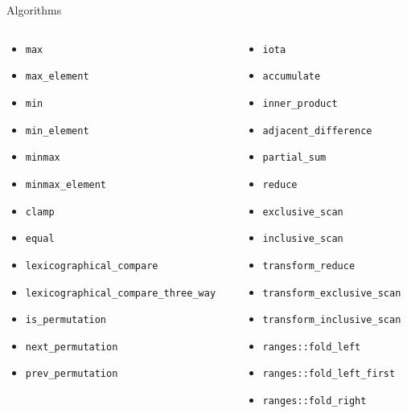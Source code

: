\documentclass[aspectratio=169]{beamer}
\begin{document}
\begin{frame}{Algorithms}
\begin{columns}
\begin{column}{.33\textwidth}
\begin{itemize}
        \item{\texttt{max}}
        \item{\texttt{max_element}}
        \item{\texttt{min}}
        \item{\texttt{min_element}}
        \item{\texttt{minmax}}
        \item{\texttt{minmax_element}}
        \item{\texttt{clamp}}
        \item{\texttt{equal}}
        \item{\texttt{lexicographical_compare}}
        \item{\texttt{lexicographical_compare_three_way}}
        \item{\texttt{is_permutation}}
        \item{\texttt{next_permutation}}
        \item{\texttt{prev_permutation}}
      \end{itemize}
    \end{column}
    \begin{column}{.33\textwidth}
      \begin{itemize}
        \item{\texttt{iota}}
        \item{\texttt{accumulate}}
        \item{\texttt{inner_product}}
        \item{\texttt{adjacent_difference}}
        \item{\texttt{partial_sum}}
        \item{\texttt{reduce}}
        \item{\texttt{exclusive_scan}}
        \item{\texttt{inclusive_scan}}
        \item{\texttt{transform_reduce}}
        \item{\texttt{transform_exclusive_scan}}
        \item{\texttt{transform_inclusive_scan}}
        \item{\texttt{ranges::fold_left}}
        \item{\texttt{ranges::fold_left_first}}
        \item{\texttt{ranges::fold_right}}

\end{itemize}
\end{column}
\end{columns}
\end{frame}
\end{document}
